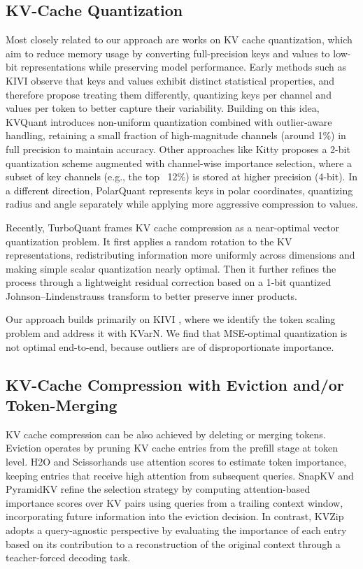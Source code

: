 \documentclass{article}
\newcommand{\methodname}{KVarN\xspace}
\begin{document}
\subsection{KV-Cache Quantization}
Most closely related to our approach are works on KV cache quantization, which aim to reduce memory usage by converting full-precision keys and values to low-bit representations while preserving model performance. Early methods such as KIVI \cite{KIVI} observe that keys and values exhibit distinct statistical properties, and therefore propose treating them differently, quantizing keys per channel and values per token to better capture their variability. Building on this idea, KVQuant \cite{hooper2024kvquant} introduces non-uniform quantization combined with outlier-aware handling, retaining a small fraction of high-magnitude channels (around 1\%) in full precision to maintain accuracy.
Other approaches like Kitty \cite{xia2025kitty} proposes a 2-bit quantization scheme augmented with channel-wise importance selection, where a subset of key channels (e.g., the top ~12\%) is stored at higher precision (4-bit). In a different direction, PolarQuant \cite{wu2026polarquant} represents keys in polar coordinates, quantizing radius and angle separately while applying more aggressive compression to values.

Recently, TurboQuant \cite{zandieh2026turboquant} frames KV cache compression as a near-optimal vector quantization problem. It first applies a random rotation to the KV representations, redistributing information more uniformly across dimensions and making simple scalar quantization nearly optimal. Then it further refines the process through a lightweight residual correction based on a 1-bit quantized Johnson–Lindenstrauss transform to better preserve inner products. 

Our approach builds primarily on KIVI \cite{KIVI}, where we identify the token scaling problem and address it with \methodname. We  find that MSE-optimal quantization is not optimal end-to-end, because outliers are of disproportionate importance. 


\subsection{KV-Cache Compression with Eviction and/or Token-Merging}
KV cache compression can be also achieved by deleting or merging tokens. Eviction operates by pruning KV cache entries from the prefill stage at token level. H2O \cite{NEURIPS2023_6ceefa7b_H2O} and Scissorhands \cite{NEURIPS2023_a452a7c6_scissorhands} use attention scores to estimate token importance, keeping entries that receive high attention from subsequent queries. SnapKV \cite{NEURIPS2024_28ab4182_SnapKV} and PyramidKV \cite{cai2025pyramidkv} refine the selection strategy by computing attention-based importance scores over KV pairs using queries from a trailing context window, incorporating future information into the eviction decision. 
In contrast, KVZip \cite{kim2026kvzip} adopts a query-agnostic perspective by evaluating the importance of each entry based on its contribution to a reconstruction of the original context through a teacher-forced decoding task.
\end{document}
